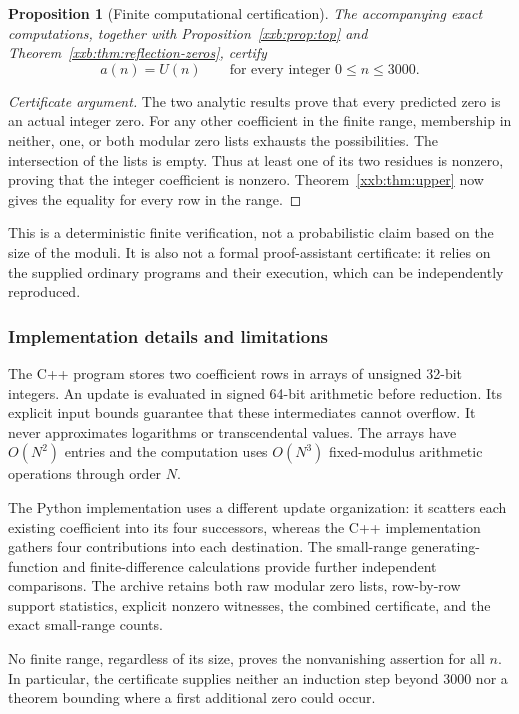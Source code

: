 \documentclass[11pt,a4paper]{article}
\numberwithin{equation}{section}
\newtheorem{proposition}[theorem]{Proposition}
\theoremstyle{definition}
\theoremstyle{remark}
\theoremstyle{plain}
\newcommand{\U}{U}
\begin{document}
\begin{proposition}[Finite computational certification]\label{xxb:prop:finite}
The accompanying exact computations, together with
Proposition~\ref{xxb:prop:top} and Theorem~\ref{xxb:thm:reflection-zeros}, certify
\begin{equation}\label{xxb:eq:finite}
 a(n)=\U(n)\qquad\text{for every integer }0\le n\le3000.
\end{equation}
\end{proposition}
\begin{proof}[Certificate argument]
The two analytic results prove that every predicted zero is an actual
integer zero. For any other coefficient in the finite range, membership
in neither, one, or both modular zero lists exhausts the possibilities.
The intersection of the lists is empty. Thus at least one of its two
residues is nonzero, proving that the integer coefficient is nonzero.
Theorem~\ref{xxb:thm:upper} now gives the equality for every row in the range.
\end{proof}
This is a deterministic finite verification, not a probabilistic claim
based on the size of the moduli. It is also not a formal proof-assistant
certificate: it relies on the supplied ordinary programs and their
execution, which can be independently reproduced.

\subsubsection{Implementation details and limitations}
The C++ program stores two coefficient rows in arrays of unsigned
32-bit integers. An update is evaluated in signed 64-bit arithmetic
before reduction. Its explicit input bounds guarantee that these
intermediates cannot overflow. It never approximates logarithms or
transcendental values. The arrays have $O(N^2)$ entries and the computation
uses $O(N^3)$ fixed-modulus arithmetic operations through order $N$.

The Python implementation uses a different update organization: it
scatters each existing coefficient into its four successors, whereas
the C++ implementation gathers four contributions into each destination.
The small-range generating-function and finite-difference calculations
provide further independent comparisons. The archive retains both raw
modular zero lists, row-by-row support statistics, explicit nonzero
witnesses, the combined certificate, and the exact small-range counts.

No finite range, regardless of its size, proves the nonvanishing assertion
for all $n$. In particular, the certificate supplies neither an induction
step beyond $3000$ nor a theorem bounding where a first additional zero
could occur.
\end{document}
